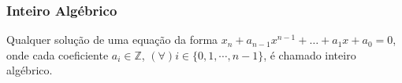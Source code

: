 \subsubsection*{Inteiro Algébrico}
Qualquer solução de uma equação da forma $x_n + a_{n - 1}x^{n - 1} + \dots + a_{1}x + a_0 = 0$,
onde cada coeficiente $a_i \in \mathbb{Z}$, $(\forall)i \in \{0, 1, \cdots, n - 1\}$, é chamado inteiro algébrico.